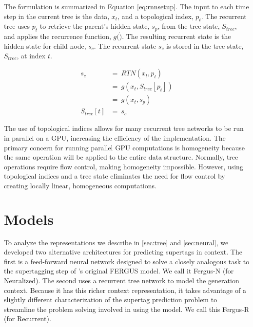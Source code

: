 \documentclass[11pt]{article}
\begin{document}
The formulation is summarized in Equation \ref{eq:rnnsetup}.
%
The input to each time step in the current tree is the data, $x_t$, and a topological
index, $p_t$.
%
The recurrent tree uses $p_t$ to retrieve the parent's hidden state, $s_p$, from the
tree state, $S_{tree}$, and applies the recurrence function, $g(\dot)$.
%
The resulting recurrent state is the hidden state for child node, $s_c$.
%
The recurrent state $s_c$ is stored in the tree state, $S_{tree}$, at index $t$.


\begin{align}
       s_c~&=~RTN(x_t,p_t) \nonumber \\
           &=~g(x_t,S_{tree}[p_t]) \nonumber \\
           &=~g(x_t, s_p) \nonumber \\
S_{tree}[t]&=~s_c \label{eq:rnnsetup}
\end{align}

The use of topological indices allows for many recurrent tree networks to be
run in parallel on a GPU, increasing the efficiency of the implementation.
%
The primary concern for running parallel GPU computations is homogeneity because
the same operation will be applied to the entire data structure.
%
Normally, tree operations require flow control, making homogeneity impossible.
%
However, using topological indices and a tree state eliminates the need for flow control
by creating locally linear, homogeneous computations.

\section{Models}
\label{sec:models}

To analyze the representations we describe in \ref{sec:tree} and
\ref{sec:neural}, we developed two alternative architectures for
predicting supertags in context.
%
The first is a feed-forward neural network designed to solve a closely
analogous task to the supertagging step of
's original FERGUS model.
%
We call it Fergus-N (for Neuralized).
%
The second uses a recurrent tree network to model the generation
context.
%
Because it has this richer context representation, it takes advantage
of a slightly different characterization of the supertag prediction
problem to streamline the problem solving involved in using the model.
%
We call this Fergus-R (for Recurrent).
\end{document}
